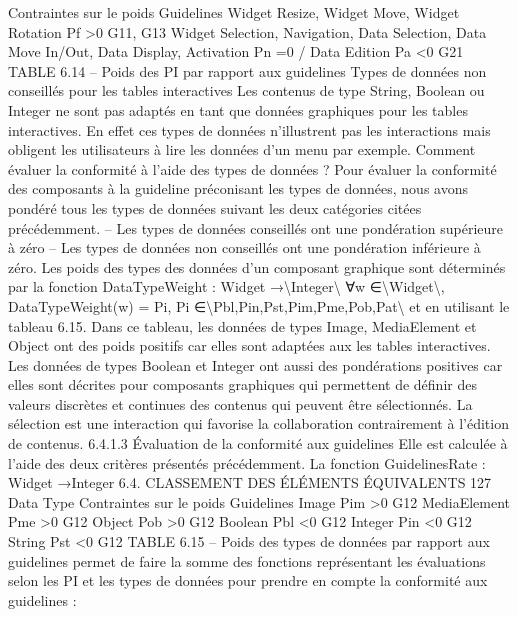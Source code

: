 \documentclass{article}
\begin{document}
Contraintes sur le
poids
Guidelines
Widget Resize,
Widget Move, Widget
Rotation
Pf >0
G11, G13
Widget Selection,
Navigation, Data
Selection, Data Move
In/Out, Data Display,
Activation
Pn =0
/
Data Edition
Pa <0
G21
TABLE 6.14 – Poids des PI par rapport aux guidelines
Types de donn\'{e}es non conseill\'{e}s pour les tables interactives
Les contenus de type String, Boolean ou Integer ne sont pas adapt\'{e}s en tant que donn\'{e}es graphiques pour les tables interactives. En
effet ces types de donn\'{e}es n’illustrent pas les interactions mais obligent les utilisateurs \`{a} lire les donn\'{e}es d’un menu par exemple.
Comment \'{e}valuer la conformit\'{e} \`{a} l’aide des types de donn\'{e}es ?
Pour \'{e}valuer la conformit\'{e} des
composants \`{a} la guideline pr\'{e}conisant les types de donn\'{e}es, nous avons pond\'{e}r\'{e} tous les types de
donn\'{e}es suivant les deux cat\'{e}gories cit\'{e}es pr\'{e}c\'{e}demment.
– Les types de donn\'{e}es conseill\'{e}s ont une pond\'{e}ration sup\'{e}rieure \`{a} z\'{e}ro
– Les types de donn\'{e}es non conseill\'{e}s ont une pond\'{e}ration inf\'{e}rieure \`{a} z\'{e}ro.
Les poids des types des donn\'{e}es d’un composant graphique sont d\'{e}termin\'{e}s par la fonction
DataTypeWeight : Widget →\textbackslash{}{Integer\textbackslash{}}
∀w ∈\textbackslash{}{Widget\textbackslash{}},
DataTypeWeight(w) = Pi, Pi ∈\textbackslash{}{Pbl,Pin,Pst,Pim,Pme,Pob,Pat\textbackslash{}}
et en utilisant le tableau 6.15. Dans ce tableau, les donn\'{e}es de types Image, MediaElement et Object
ont des poids positifs car elles sont adapt\'{e}es aux les tables interactives. Les donn\'{e}es de types Boolean
et Integer ont aussi des pond\'{e}rations positives car elles sont d\'{e}crites pour composants graphiques qui
permettent de d\'{e}ﬁnir des valeurs discr\`{e}tes et continues des contenus qui peuvent \^{e}tre s\'{e}lectionn\'{e}s. La
s\'{e}lection est une interaction qui favorise la collaboration contrairement \`{a} l’\'{e}dition de contenus.
6.4.1.3
Évaluation de la conformit\'{e} aux guidelines
Elle est calcul\'{e}e \`{a} l’aide des deux crit\`{e}res pr\'{e}sent\'{e}s pr\'{e}c\'{e}demment. La fonction
GuidelinesRate : Widget →Integer
6.4. CLASSEMENT DES ÉLÉMENTS ÉQUIVALENTS
127
Data Type
Contraintes sur le
poids
Guidelines
Image
Pim >0
G12
MediaElement
Pme >0
G12
Object
Pob >0
G12
Boolean
Pbl <0
G12
Integer
Pin <0
G12
String
Pst <0
G12
TABLE 6.15 – Poids des types de donn\'{e}es par rapport aux guidelines
permet de faire la somme des fonctions repr\'{e}sentant les \'{e}valuations selon les PI et les types de donn\'{e}es
pour prendre en compte la conformit\'{e} aux guidelines :
\end{document}

